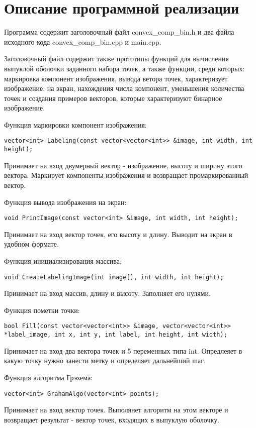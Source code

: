 \documentclass{report}
\begin{document}
\section*{Описание программной реализации}
Программа содержит заголовочный файл convex\_comp\_bin.h и два файла исходного кода convex\_comp\_bin.cpp и main.cpp.
\par Заголовочный файл содержит также прототипы функций для вычисления выпуклой оболочки заданного набора точек, а также функции, среди которых: маркировка компонент изображения, вывода ветора точек, характеризует изображение, на экран, нахождения числа компонент, уменьшения количества точек и создания примеров векторов, которые характеризуют бинарное изображение.
\par Функция маркировки компонент изображения:
\begin{lstlisting}
vector<int> Labeling(const vector<vector<int>> &image, int width, int height);
\end{lstlisting}
Принимает на вход двумерный вектор - изображение, высоту и ширину этого вектора. Маркирует компоненты изображения и возвращает промаркированный вектор.
\par Функция вывода изображения на экран:
\begin{lstlisting}
void PrintImage(const vector<int> &image, int width, int height);
\end{lstlisting}
Принимает на вход вектор точек, его высоту и длину. Выводит на экран в удобном формате.
\par Функция инициализирования массива:
\begin{lstlisting}
void CreateLabelingImage(int image[], int width, int height);
\end{lstlisting}
Принимает на вход массив, длину и высоту. Заполняет его нулями.
\par Функция пометки точки:
\begin{lstlisting}
bool Fill(const vector<vector<int>> &image, vector<vector<int>> *label_image, int x, int y, int label, int height, int width);
\end{lstlisting}
Принимает на вход два вектора точек и 5 переменных типа int. Опредлеяет в какую точку нужно занести метку и определяет дальнейший шаг.
\par Функция алгоритма Грэхема:
\begin{lstlisting}
vector<int> GrahamAlgo(vector<int> points);
\end{lstlisting}
Принимает на вход вектор точек. Выполянет алгоритм на этом векторе и возвращает результат - вектор точек, входящих в выпуклую оболочку.
\end{document}
